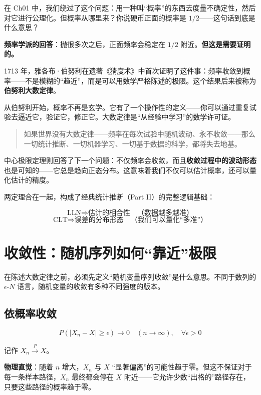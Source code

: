 \documentclass[
]{book}
\begin{document}
在 Ch01 中，我们绕过了这个问题：用一种叫``概率''的东西去度量不确定性，然后对它进行公理化。但概率从哪里来？你说硬币正面的概率是 \(1/2\)------这句话到底是什么意思？

\textbf{频率学派的回答}：抛很多次之后，正面频率会稳定在 \(1/2\) 附近。\textbf{但这是需要证明的。}

1713 年，雅各布·伯努利在遗著《猜度术》中首次证明了这件事：频率收敛到概率------不是模糊的``趋近''，而是可以用数学严格陈述的极限。这个结果后来被称为\textbf{伯努利大数定律}。

从伯努利开始，概率不再是玄学。它有了一个操作性的定义------你可以通过重复试验去逼近它，验证它，修正它。大数定律是``从经验中学习''的数学许可证。

\begin{quote}
如果世界没有大数定律------频率在每次试验中随机波动、永不收敛------那么一切统计推断、一切机器学习、一切基于数据的科学，都将失去地基。
\end{quote}

中心极限定理则回答了下一个问题：不仅频率会收敛，而且\textbf{收敛过程中的波动形态}也是可知的------它总是趋向正态分布。这意味着我们不仅可以估计概率，还可以量化估计的精度。

两定理合在一起，构成了经典统计推断（Part II）的完整逻辑基础：

\[\text{LLN} \Rightarrow \text{估计的相合性} \quad \text{（数据越多越准）}\] \[\text{CLT} \Rightarrow \text{误差的分布形态} \quad \text{（我们可以量化“多准”）}\]

\section{收敛性：随机序列如何``靠近''极限}\label{ux6536ux655bux6027ux968fux673aux5e8fux5217ux5982ux4f55ux9760ux8fd1ux6781ux9650}

在陈述大数定律之前，必须先定义``随机变量序列收敛''是什么意思。不同于数列的 \(\epsilon\)-\(N\) 语言，随机变量的收敛有多种不同强度的版本。

\subsection{依概率收敛}\label{ux4f9dux6982ux7387ux6536ux655b}

\[P(|X_n - X| \geq \epsilon) \to 0 \quad (n \to \infty), \quad \forall \epsilon > 0\]

记作 \(X_n \xrightarrow{P} X\)。

\textbf{物理直觉}：随着 \(n\) 增大，\(X_n\) 与 \(X\) ``显著偏离''的可能性趋于零。但这不保证对于每一条样本路径，\(X_n\) 最终都会停在 \(X\) 附近------它允许少数``出格的''路径存在，只要这些路径的概率趋于零。
\end{document}
